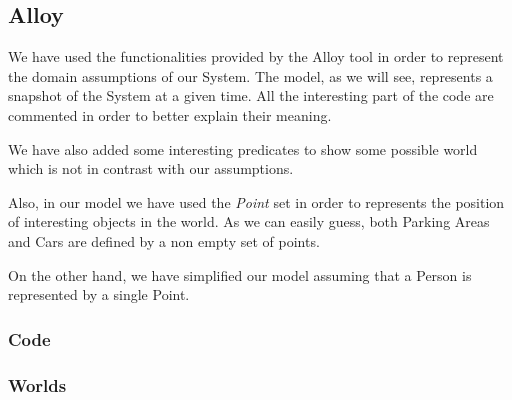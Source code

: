 \subsection{Alloy}
We have used the functionalities provided by the Alloy tool in order to represent the domain assumptions of our System. 
The model, as we will see, represents a snapshot of the System at a given time.
All the interesting part of the code are commented in order to better explain their meaning.

We have also added some interesting predicates to show some possible world which is not in contrast with our assumptions.

Also, in our model we have used the \textit{Point} set in order to represents the position of interesting objects in the world. As we can easily guess, both Parking Areas and Cars are defined by a non empty set of points.

On the other hand, we have simplified our model assuming that a Person is represented by a single Point.


\subsubsection{Code}
	




\subsubsection{Worlds}

